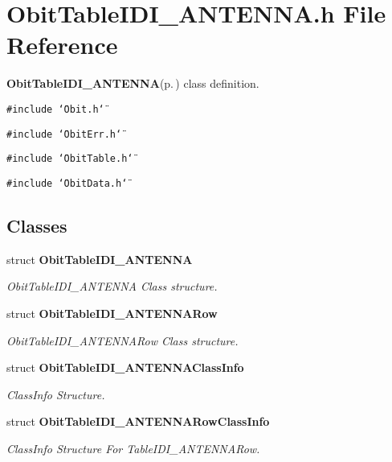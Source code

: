 \section{Obit\-Table\-IDI\_\-ANTENNA.h File Reference}
\label{ObitTableIDI__ANTENNA_8h}
{\bf Obit\-Table\-IDI\_\-ANTENNA}{\rm (p.\,\pageref{structObitTableIDI__ANTENNA})} class definition. 

{\tt \#include \char`\"{}Obit.h\char`\"{}}\par
{\tt \#include \char`\"{}Obit\-Err.h\char`\"{}}\par
{\tt \#include \char`\"{}Obit\-Table.h\char`\"{}}\par
{\tt \#include \char`\"{}Obit\-Data.h\char`\"{}}\par
\subsection*{Classes}
\begin{CompactItemize}
\item 
struct {\bf Obit\-Table\-IDI\_\-ANTENNA}
\begin{CompactList}\small\item\em Obit\-Table\-IDI\_\-ANTENNA Class structure. \item\end{CompactList}\item 
struct {\bf Obit\-Table\-IDI\_\-ANTENNARow}
\begin{CompactList}\small\item\em Obit\-Table\-IDI\_\-ANTENNARow Class structure. \item\end{CompactList}\item 
struct {\bf Obit\-Table\-IDI\_\-ANTENNAClass\-Info}
\begin{CompactList}\small\item\em Class\-Info Structure. \item\end{CompactList}\item 
struct {\bf Obit\-Table\-IDI\_\-ANTENNARow\-Class\-Info}
\begin{CompactList}\small\item\em Class\-Info Structure For Table\-IDI\_\-ANTENNARow. \item\end{CompactList}\end{CompactItemize}
